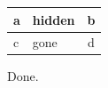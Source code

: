 \documentclass{article}
\begin{document}
\begin{tabular}{lHc}
a & hidden & b \\
\hline
c & gone & d \\
\end{tabular}
Done.
\end{document}
